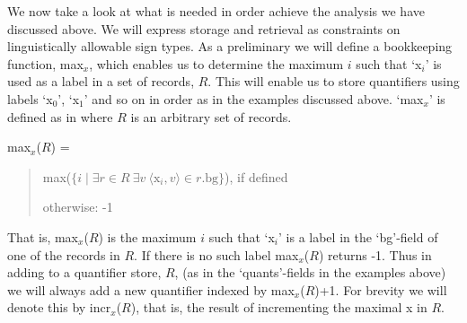 We now take a look at what is needed in order achieve the analysis we
have discussed above.  We will express storage and retrieval as
constraints on linguistically allowable sign types.  As a preliminary
we will define a bookkeeping function, max$_x$, which enables us to determine
the maximum $i$ such that `x$_i$' is used as a label in a set of
records, $R$.  This will enable us to store quantifiers using labels
`x$_0$', `x$_1$' and so on in order as in the examples discussed
above. `max$_x$' is defined as in \nexteg{} where $R$ is an arbitrary
set of records.
\begin{ex} 
max$_x$($R$) = 
\begin{quote}
max($\{i\mid\exists r\in R\ \exists v\ \langle \mathrm{x}_i,v\rangle\in r.\mathrm{bg}\}$), if
defined

otherwise: -1 
\end{quote}
\end{ex}
That is, max$_x$($R$) is the maximum $i$ such that `x$_i$' is a label
in the `bg'-field of one of the records in $R$.  If there is no such label max$_x$($R$)
returns -1. Thus in adding to a quantifier store, $R$, (as in the
`quants'-fields in the examples above) we will always add a new
quantifier indexed by max$_x$($R$)+1.  For brevity we will denote this by
incr$_x$($R$), that is, the result of incrementing the maximal x in $R$. 

